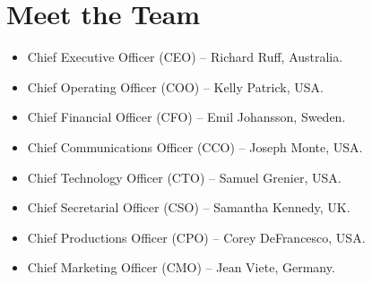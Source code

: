 \documentclass[12pt,a4paper]{article}
\begin{document}
  \section*{Meet the Team}
  \begin{itemize}
    \item{Chief Executive Officer (CEO) – Richard Ruff, Australia.}
    \item{Chief Operating Officer (COO) – Kelly Patrick, USA.}
    \item{Chief Financial Officer (CFO) – Emil Johansson, Sweden.}
    \item{Chief Communications Officer (CCO) – Joseph Monte, USA.}
    \item{Chief Technology Officer (CTO) – Samuel Grenier, USA.}
    \item{Chief Secretarial Officer (CSO) – Samantha Kennedy, UK.}
    \item{Chief Productions Officer (CPO) – Corey DeFrancesco, USA.}
    \item{Chief Marketing Officer (CMO) – Jean Viete, Germany.}
  \end{itemize}
  \printbibliography{}
\end{document}
